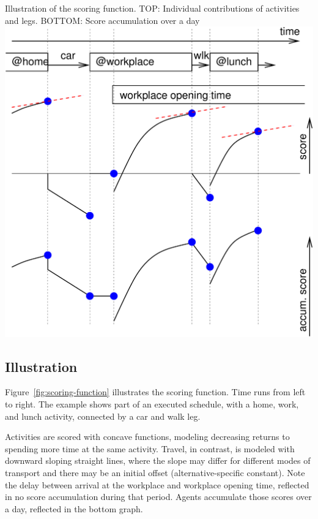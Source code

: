 %
{Illustration of the scoring function. TOP: Individual contributions of activities and legs.  BOTTOM: Score accumulation over a day%
}%
{\label{fig:scoring-function}}%
{\includegraphics[width=0.8\hsize,trim=0 0 0 0,clip]{using/figures/scoring-example}}%
{}

\subsection{Illustration}
\label{sec:utl-fct-illustration}
Figure~\ref{fig:scoring-function} illustrates the scoring function.  Time runs from left to right.  The example shows part of an executed schedule, with a home, work, and lunch activity, connected by a car and walk leg.

Activities are scored with concave functions, modeling decreasing returns to spending more time at the same activity.  Travel, in contrast, is modeled with downward sloping straight lines, where the slope may differ for different modes of transport and there may be an initial offset (alternative-specific constant).  Note the delay between arrival at the workplace and workplace opening time, reflected in no score accumulation during that period.  Agents accumulate those scores over a day, reflected in the bottom graph.

